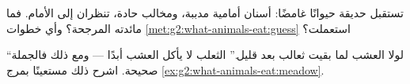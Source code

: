 \begin{exercise}[$\star\star$]\label{exo:g2:what-animals-eat:9}
تستقبل حديقة  حيوانًا غامضًا: أسنان أمامية مدببة، ومخالب
حادة،  تنظران إلى الأمام. فما مائدته المرجحة؟ وأي خطوات
\cref{met:g2:what-animals-eat:guess} استعملت؟
\end{exercise}

\begin{exercise}[$\star\star$]\label{exo:g2:what-animals-eat:10}
``لولا العشب لما بقيت ثعالب بعد قليل.'' الثعلب لا يأكل العشب
أبدًا --- ومع ذلك فالجملة صحيحة. اشرح ذلك مستعينًا بمرج
\cref{ex:g2:what-animals-eat:meadow}.
\end{exercise}
